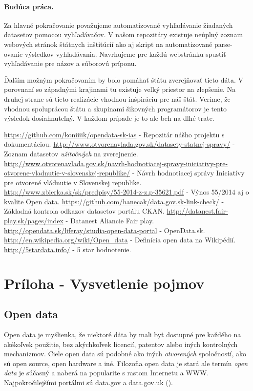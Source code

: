 \documentclass[12pt,a4paper]{article}
\begin{document}
\paragraph{Budúca práca.} 
\label{future-work} 
Za hlavné pokračovanie považujeme automatizované vyhľadávanie žiadaných datasetov pomocou vyhľadávačov. V našom repozitáry existuje neúplný zoznam webových stránok štátnych inštitúcií ako aj skript na automatizované parse-ovanie výsledkov vyhľadávania. Navrhujeme pre každú webstránku spustiť vyhľadávanie pre názov a súborovú príponu. 

Ďalším možným pokračovaním by bolo pomáhať štátu zverejňovať tieto dáta. V porovnaní so západnými krajinami tu existuje veľký priestor na zlepšenie. Na druhej strane sú tieto realizácie vhodnou inšpiráciu pre náš štát. Veríme, že vhodnou spoluprácou štátu a skupinami šikovných programátorov je tento výsledok dosiahnuteľný. V každom prípade je to ale beh na dlhé trate. 

\renewcommand{\refname}{Literatúra}
{}
\begin{thebibliography}{99}
   \url{https://github.com/koniiiik/opendata-sk-ias} - Repozitár nášho projektu s dokumentáciou. 
   \url{http://www.otvorenavlada.gov.sk/datasety-statnej-spravy/} - Zoznam datasetov \emph{užitočných} na zverejnenie.
   \url{http://www.otvorenavlada.gov.sk/navrh-hodnotiacej-spravy-iniciativy-pre-otvorene-vladnutie-v-slovenskej-republike/} - Návrh hodnotiacej správy Iniciatívy pre otvorené vládnutie v Slovenskej republike.
   \url{http://www.zbierka.sk/sk/predpisy/55-2014-z-z.p-35621.pdf} - Výnos 55/2014 aj o kvalite Open data. 
   \url{https://github.com/hanecak/data.gov.sk-link-check/} - Základná kontrola odkazov datasetov portálu CKAN. 
   \url{http://datanest.fair-play.sk/pages/index} - Datanest Aliancie Fair play. 
   \url{http://opendata.sk/liferay/studia-open-data-portal} - OpenData.sk. 
   \url{http://en.wikipedia.org/wiki/Open_data} - Definícia open data na Wikipédií. 
   \url{http://5stardata.info/} - 5 star hodnotenie. 
\end{thebibliography}


\section*{Príloha - Vysvetlenie pojmov} 
\subsection*{Open data} 
\label{opendata} 
Open data je myšlienka, že niektoré dáta by mali byť dostupné pre každého na akékoľvek použitie, bez akýchkoľvek licencií, patentov alebo iných kontrolných mechanizmov. Ciele open data sú podobné ako iných \emph{otvorených} spoločností, ako sú open source, open hardware a iné. Filozofia open data je stará ale termín \emph{open data} je súčasný a naberá na popularite s rastom Internetu a WWW. Najpokročilejšími portálmi sú data.gov a data.gov.uk (\cite{opendata-wiki}). 
\end{document}
